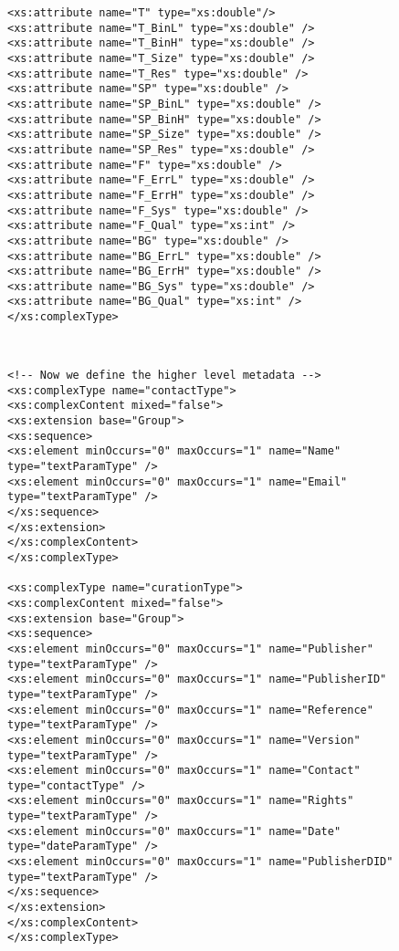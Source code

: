 {\begin{flushleft}
\begin{fmppage}
\begin{verbatim}
<xs:attribute name="T" type="xs:double"/>
<xs:attribute name="T_BinL" type="xs:double" />
<xs:attribute name="T_BinH" type="xs:double" />
<xs:attribute name="T_Size" type="xs:double" />
<xs:attribute name="T_Res" type="xs:double" />
<xs:attribute name="SP" type="xs:double" />
<xs:attribute name="SP_BinL" type="xs:double" />
<xs:attribute name="SP_BinH" type="xs:double" />
<xs:attribute name="SP_Size" type="xs:double" />
<xs:attribute name="SP_Res" type="xs:double" />
<xs:attribute name="F" type="xs:double" />
<xs:attribute name="F_ErrL" type="xs:double" />
<xs:attribute name="F_ErrH" type="xs:double" />
<xs:attribute name="F_Sys" type="xs:double" />
<xs:attribute name="F_Qual" type="xs:int" />
<xs:attribute name="BG" type="xs:double" />
<xs:attribute name="BG_ErrL" type="xs:double" />
<xs:attribute name="BG_ErrH" type="xs:double" />
<xs:attribute name="BG_Sys" type="xs:double" />
<xs:attribute name="BG_Qual" type="xs:int" />
</xs:complexType>

\end{verbatim}
\end{fmppage}

\begin{fmppage}
\begin{verbatim}


<!-- Now we define the higher level metadata -->
<xs:complexType name="contactType">
<xs:complexContent mixed="false">
<xs:extension base="Group">
<xs:sequence>
<xs:element minOccurs="0" maxOccurs="1" name="Name" type="textParamType" />
<xs:element minOccurs="0" maxOccurs="1" name="Email" type="textParamType" />
</xs:sequence>
</xs:extension>
</xs:complexContent>
</xs:complexType>

<xs:complexType name="curationType">
<xs:complexContent mixed="false">
<xs:extension base="Group">
<xs:sequence>
<xs:element minOccurs="0" maxOccurs="1" name="Publisher" type="textParamType" />
<xs:element minOccurs="0" maxOccurs="1" name="PublisherID" type="textParamType" />
<xs:element minOccurs="0" maxOccurs="1" name="Reference" type="textParamType" />
<xs:element minOccurs="0" maxOccurs="1" name="Version" type="textParamType" />
<xs:element minOccurs="0" maxOccurs="1" name="Contact" type="contactType" />
<xs:element minOccurs="0" maxOccurs="1" name="Rights" type="textParamType" />
<xs:element minOccurs="0" maxOccurs="1" name="Date" type="dateParamType" />
<xs:element minOccurs="0" maxOccurs="1" name="PublisherDID" type="textParamType" />
</xs:sequence>
</xs:extension>
</xs:complexContent>
</xs:complexType>



\end{verbatim}
\end{fmppage}
\end{flushleft}}
